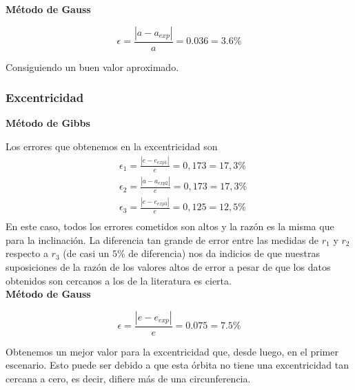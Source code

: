 \documentclass{article}
\numberwithin{equation}{section}
\begin{document}
\noindent\textbf{Método de Gauss}\par

\begin{equation*}
    \epsilon=\frac{\left\lvert a-a_{exp} \right\rvert}{a}=0.036=3.6\%
\end{equation*}

Consiguiendo un buen valor aproximado.

\subsubsection{Excentricidad}
\noindent\textbf{Método de Gibbs}\par
Los errores que obtenemos en la excentricidad son 
\begin{align*}
    &\epsilon_{1}=\frac{\left\lvert e-e_{exp1} \right\rvert }{e}=0,173=17,3\% \\
    &\epsilon_{2}=\frac{\left\lvert a-a_{exp2} \right\rvert }{e}=0,173=17,3\% \\
    &\epsilon_{3}=\frac{\left\lvert e-e_{exp3} \right\rvert }{e}=0,125=12,5\% \\
\end{align*}
En este caso, todos los errores cometidos son altos y la 
razón es la misma que para la inclinación. La diferencia 
tan grande de error entre las medidas de $r_{1}$ y $r_{2}$ 
respecto a $r_{3}$ (de casi un $5\%$ de diferencia) nos da 
indicios de que nuestras suposiciones de la razón de los 
valores altos de error a pesar de que los datos obtenidos 
son cercanos a los de la literatura es cierta.\\

\noindent\textbf{Método de Gauss}\par

\begin{equation*}
    \epsilon=\frac{\left\lvert e-e_{exp} \right\rvert}{e}=0.075=7.5\%
\end{equation*}

Obtenemos un mejor valor para la excentricidad que, desde luego, en el primer escenario. Esto puede ser debido a que esta órbita no tiene una excentricidad tan cercana a cero, es decir, difiere más de una circunferencia.
\end{document}
